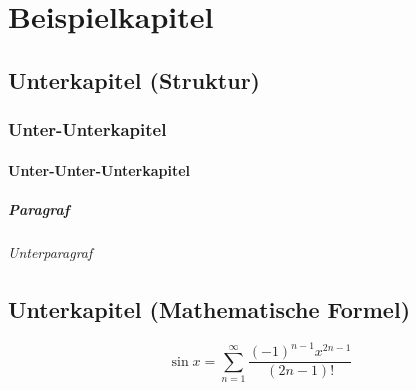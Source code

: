 \chapter{Beispielkapitel}
\lipsum[1] \autocite{samulowitzBibliothekUndDokumentation2003,sarrafzadehKnowledgeManagementIts2010,saurWissenschaftlicheVerlageVersuch2016,scholzeOpenAccessUnd2016,schrettingerVersuchVollstaendigenLehrbuchs1829,seadleFragilityFutureLibrary2016,siegfriedNutzerbezogeneMarktforschungFuer2014}

\section{Unterkapitel (Struktur)}
\lipsum[3-4]

\subsection{Unter-Unterkapitel}
\lipsum[5-6]

\subsubsection{Unter-Unter-Unterkapitel}
\lipsum[66]

\paragraph{Paragraf}
\lipsum[66]

\subparagraph{Unterparagraf}
\lipsum[75]

\section{Unterkapitel (Mathematische Formel)}
\lipsum[1-5]
\begin{equation}
    \sin x = \sum\limits_{n = 1}^\infty  {\frac{{\left( { - 1} \right)^{n - 1} x^{2n - 1} }}{{\left( {2n - 1} \right)!}}}    
\end{equation}
\lipsum[1]